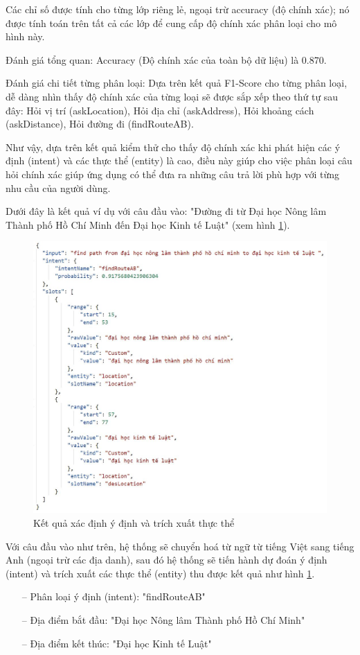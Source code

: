 Các chỉ số được tính cho từng lớp riêng lẻ, ngoại trừ accuracy (độ chính xác); nó được tính toán trên tất cả các lớp để cung cấp độ chính xác phân loại cho mô hình này.

Đánh giá tổng quan: Accuracy (Độ chính xác của toàn bộ dữ liệu) là 0.870.

Đánh giá chi tiết từng phân loại: Dựa trên kết quả F1-Score cho từng phân loại, dễ dàng nhìn thấy độ chính xác của từng loại sẽ được sắp xếp theo thứ tự sau đây: Hỏi vị trí (askLocation), Hỏi địa chỉ (askAddress), Hỏi khoảng cách (askDistance), Hỏi đường đi (findRouteAB).

Như vậy, dựa trên kết quả kiểm thử cho thấy độ chính xác khi phát hiện các ý định (intent) và các thực thể (entity) là cao, điều này giúp cho việc phân loại câu hỏi chính xác giúp ứng dụng có thể đưa ra những câu trả lời phù hợp với từng nhu cầu của người dùng.

Dưới đây là kết quả ví dụ với câu đầu vào: "Đường đi từ Đại học Nông lâm Thành phố Hồ Chí Minh đến Đại học Kinh tế Luật" (xem hình \ref{fig:detect-intent}).

\begin{figure}[H]
    \centering
    \includegraphics[width=15cm]{images/detect_intent.jpg}
    \caption{Kết quả xác định ý định và trích xuất thực thể}
    \label{fig:detect-intent}
\end{figure}

Với câu đầu vào như trên, hệ thống sẽ chuyển hoá từ ngữ từ tiếng Việt sang tiếng Anh (ngoại trừ các địa danh), sau đó hệ thống sẽ tiến hành dự đoán ý định (intent) và trích xuất các thực thể (entity) thu được kết quả như hình \ref{fig:detect-intent}.
\begin{itemize}
    \item[--] Phân loại ý định (intent): "findRouteAB"
    \item[--] Địa điểm bắt đầu: "Đại học Nông lâm Thành phố Hồ Chí Minh"
    \item[--] Địa điểm kết thúc: "Đại học Kinh tế Luật"
\end{itemize}

